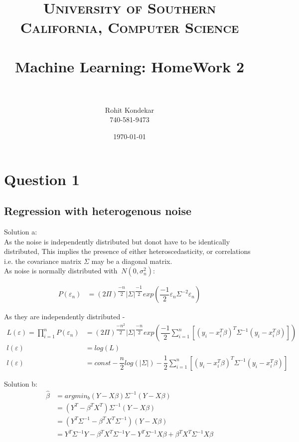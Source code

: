 \documentclass[paper=a4, fontsize=11pt]{scrartcl} %
\title{	
\normalfont \normalsize 
\textsc{University of Southern California, Computer Science} \\ [25pt] %
\horrule{0.5pt} \\[0.4cm] %
\huge Machine Learning: HomeWork 2 \\ %
\horrule{2pt} \\[0.5cm] %
}
\author{Rohit Kondekar\\
740-581-9473} %
\date{\normalsize\today} %
\numberwithin{equation}{section} %
\numberwithin{figure}{section} %
\numberwithin{table}{section} %
\begin{document}
\maketitle %


\section{Question 1}
\subsection{Regression with heterogenous noise}


\begingroup
Solution a:\\
As the noise is independently distributed but donot have to be identically distributed, This implies the presence of either heteroscedasticity, or correlations i.e. the covariance matrix \begin{math}\Sigma\end{math} may be a diagonal matrix.\\

As noise is normally distributed with \begin{math}~N(0,\sigma_{n}^{2})\end{math}:

\begin{align*} 
P(\varepsilon_{n}) &= (2\Pi)^{\dfrac{-n}{2}}|\Sigma|^{\dfrac{-1}{2}}exp(\dfrac{-1}{2}\varepsilon_{n}\Sigma^{-2}\varepsilon_{n})
\end{align*}

As they are independently distributed - 
\begin{align*}
L(\varepsilon) = \prod_{i=1}^{n}P(\varepsilon_{n}) &= (2\Pi)^{\dfrac{-n^{2}}{2}}|\Sigma|^{\dfrac{-n}{2}}exp(\dfrac{-1}{2}\sum_{i=1}^{n}[(y_{i}-x_{i}^{T}\beta)^{T}\Sigma^{-1}(y_{i}-x_{i}^{T}\beta)])\\
l(\varepsilon) &= log(L)\\
l(\varepsilon) &=  const - \dfrac{n}{2}log(|\Sigma|) - \dfrac{1}{2}\sum_{i=1}^{n}[(y_{i}-x_{i}^{T}\beta)^{T}\Sigma^{-1}(y_{i}-x_{i}^{T}\beta)]
\end{align*}


Solution b:
\begin{align*}
\hat{\beta} &= argmin_{b}(Y-X\beta)\Sigma^{-1}(Y-X\beta)\\
&= (Y^{T}-\beta^{T}X^{T})\Sigma^{-1}(Y-X\beta)\\
&= (Y^{T}\Sigma^{-1}-\beta^{T}X^{T}\Sigma^{-1})(Y-X\beta)\\
&= Y^{T}\Sigma^{-1}Y - \beta^{T}X^{T}\Sigma^{-1}Y - Y^{T}\Sigma^{-1}X\beta + \beta^{T}X^{T}\Sigma^{-1}X\beta
\end{align*}
\end{document}
